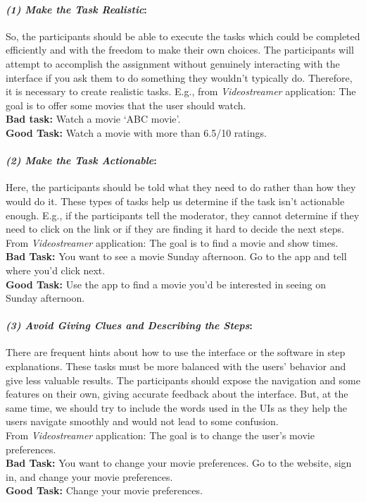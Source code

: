 \paragraph{\textit{(1) Make the Task Realistic}:}
So, the participants should be able to execute the tasks which could be completed efficiently and with the freedom to make their own choices.
The participants will attempt to accomplish the assignment without genuinely interacting with the interface if you ask them to do something they wouldn't typically do. 
Therefore, it is necessary to create realistic tasks.
E.g., from \textit{Videostreamer} application: The goal is to offer some movies that the user should watch. \\
\textbf{Bad task: } Watch a movie `ABC movie'.\\
\textbf{Good Task: } Watch a movie with more than 6.5/10 ratings. \\

\paragraph{\textit{(2) Make the Task Actionable}:}
Here, the participants should be told what they need to do rather than how they would do it.
These types of tasks help us determine if the task isn’t actionable enough. 
E.g., if the participants tell the moderator, they cannot determine if they need to click on the link or if they are finding it hard to decide the next steps.
From \textit{Videostreamer} application: The goal is to find a movie and show times. \\
\textbf{Bad Task: } You want to see a movie Sunday afternoon. Go to the app and tell where you’d click next. \\
\textbf{Good Task: } Use the app to find a movie you’d be interested in seeing on Sunday afternoon. \\

\paragraph{\textit{(3) Avoid Giving Clues and Describing the Steps}:}
There are frequent hints about how to use the interface or the software in step explanations.
These tasks must be more balanced with the users' behavior and give less valuable results.   
The participants should expose the navigation and some features on their own, giving accurate feedback about the interface.
But, at the same time, we should try to include the words used in the UIs as they help the users navigate smoothly and would not lead to some confusion. \\
From \textit{Videostreamer} application: The goal is to change the user's movie preferences. \\
\textbf{Bad Task: } You want to change your movie preferences. Go to the website, sign in, and change your movie preferences. \\
\textbf{Good Task: } Change your movie preferences.

